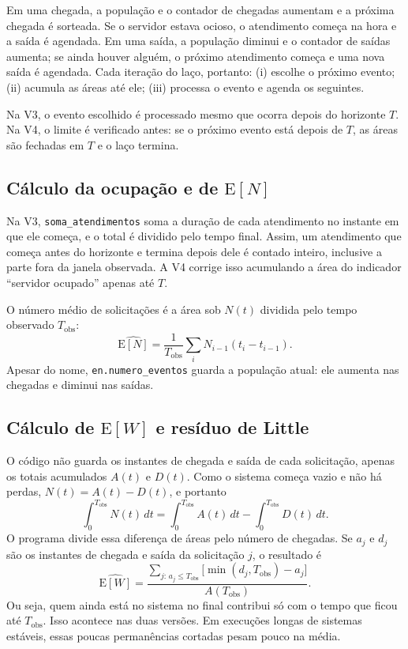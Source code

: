 \documentclass[
  article,      %
  10pt,         %
  oneside,
  a4paper,
  twocolumn,    %
  english,
  brazil        %
]{abntex2}
\newcommand{\EN}{\mathrm{E}[N]}
\newcommand{\EW}{\mathrm{E}[W]}
\begin{document}
Em uma chegada, a população e o contador de chegadas aumentam e a próxima chegada é sorteada. Se o servidor estava ocioso, o atendimento começa na hora e a saída é agendada. Em uma saída, a população diminui e o contador de saídas aumenta; se ainda houver alguém, o próximo atendimento começa e uma nova saída é agendada. Cada iteração do laço, portanto: (i) escolhe o próximo evento; (ii) acumula as áreas até ele; (iii) processa o evento e agenda os seguintes.

Na V3, o evento escolhido é processado mesmo que ocorra depois do horizonte $T$. Na V4, o limite é verificado antes: se o próximo evento está depois de $T$, as áreas são fechadas em $T$ e o laço termina.

\subsection{Cálculo da ocupação e de \texorpdfstring{$\EN$}{E[N]}}

Na V3, \texttt{soma\_atendimentos} soma a duração de cada atendimento no instante em que ele começa, e o total é dividido pelo tempo final. Assim, um atendimento que começa antes do horizonte e termina depois dele é contado inteiro, inclusive a parte fora da janela observada. A V4 corrige isso acumulando a área do indicador ``servidor ocupado'' apenas até $T$.

O número médio de solicitações é a área sob $N(t)$ dividida pelo tempo observado $T_{\mathrm{obs}}$:
\begin{equation}
  \widehat{\EN}=\frac{1}{T_{\mathrm{obs}}}\sum_i N_{i-1}(t_i-t_{i-1}).
\end{equation}
Apesar do nome, \texttt{en.numero\_eventos} guarda a população atual: ele aumenta nas chegadas e diminui nas saídas.

\subsection{Cálculo de \texorpdfstring{$\EW$}{E[W]} e resíduo de Little}
\label{sec:ew}

O código não guarda os instantes de chegada e saída de cada solicitação, apenas os totais acumulados $A(t)$ e $D(t)$. Como o sistema começa vazio e não há perdas, $N(t)=A(t)-D(t)$, e portanto
\begin{equation}
  \int_0^{T_{\mathrm{obs}}} N(t)\,dt
  =\int_0^{T_{\mathrm{obs}}} A(t)\,dt
  -\int_0^{T_{\mathrm{obs}}} D(t)\,dt.
\end{equation}
O programa divide essa diferença de áreas pelo número de chegadas. Se $a_j$ e $d_j$ são os instantes de chegada e saída da solicitação $j$, o resultado é
\begin{equation}
  \widehat{\EW}=
  \frac{\sum_{j:\,a_j\leq T_{\mathrm{obs}}}
  \bigl[\min(d_j,T_{\mathrm{obs}})-a_j\bigr]}
  {A(T_{\mathrm{obs}})}.
  \label{eq:permanencia-truncada}
\end{equation}
Ou seja, quem ainda está no sistema no final contribui só com o tempo que ficou até $T_{\mathrm{obs}}$. Isso acontece nas duas versões. Em execuções longas de sistemas estáveis, essas poucas permanências cortadas pesam pouco na média.
\end{document}
